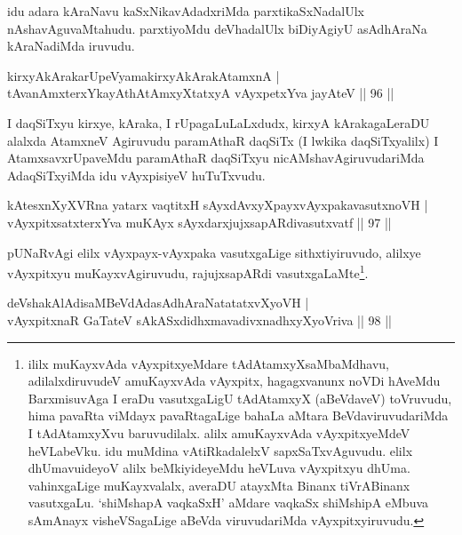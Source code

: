 \begin{artha}
idu adara kAraNavu kaSxNikavAdadxriMda parxtikaSxNadalUlx nAshavAguvaMtahudu. parxtiyoMdu deVhadalUlx biDiyAgiyU asAdhAraNa kAraNadiMda iruvudu.
\end{artha}%

\begin{shl}
kirxyAkArakarUpeVyamakirxyA\s kArakAtamxnA |\\
tAvanAmxterxYkayAthAtAmxyXtatxyA vAyxpetxYva jayAteV \hfill || 96 ||
\end{shl}

\begin{artha}
I daqSiTxyu kirxye, kAraka, I rUpagaLuLaLxdudx, kirxyA kArakagaLeraDU alalxda AtamxneV Agiruvudu paramAthaR daqSiTx (I lwkika daqSiTxyalilx) I AtamxsavxrUpaveMdu paramAthaR daqSiTxyu nicAMshavAgiruvudariMda AdaqSiTxyiMda idu vAyxpisiyeV huTuTxvudu.
\end{artha}


\begin{shl}
kAtesxnXyXVRna yatarx vaqtitxH sAyxdAvxyXpayxvAyxpakavasutxnoVH |\\
vAyxpitxsatxterxYva muKAyx sAyxdarxjujxsapARdivasutxvatf \hfill || 97 ||
\end{shl}

\begin{artha}
pUNaRvAgi elilx vAyxpayx-vAyxpaka vasutxgaLige sithxtiyiruvudo, alilxye vAyxpitxyu muKayxvAgiruvudu, rajujxsapARdi vasutxgaLaMte\footnote[1]{ililx muKayxvAda vAyxpitxyeMdare tAdAtamxyXsaMbaMdhavu, adilalxdiruvudeV amuKayxvAda vAyxpitx, hagagxvanunx noVDi hAveMdu BarxmisuvAga I eraDu vasutxgaLigU tAdAtamxyX (aBeVdaveV) toVruvudu, hima pavaRta viMdayx pavaRtagaLige bahaLa aMtara BeVdaviruvudariMda I tAdAtamxyXvu baruvudilalx. alilx amuKayxvAda vAyxpitxyeMdeV heVLabeVku. idu muMdina vAtiRkadalelxV sapxSaTxvAguvudu. elilx dhUmavuideyoV alilx beMkiyideyeMdu heVLuva vAyxpitxyu dhUma. vahinxgaLige muKayxvalalx, averaDU atayxMta Binanx tiVrABinanx vasutxgaLu. `shiMshapA vaqkaSxH' aMdare vaqkaSx shiMshipA eMbuva sAmAnayx visheVSagaLige aBeVda viruvudariMda vAyxpitxyiruvudu.}.
\end{artha}


\begin{shl}
deVshakAlAdisaMBeVdAdasAdhAraNatatatxvXyoVH |\\
vAyxpitxnaR GaTateV sAkASxdidhxmavadivxnadhxyXyoVriva \hfill || 98 ||
\end{shl}

